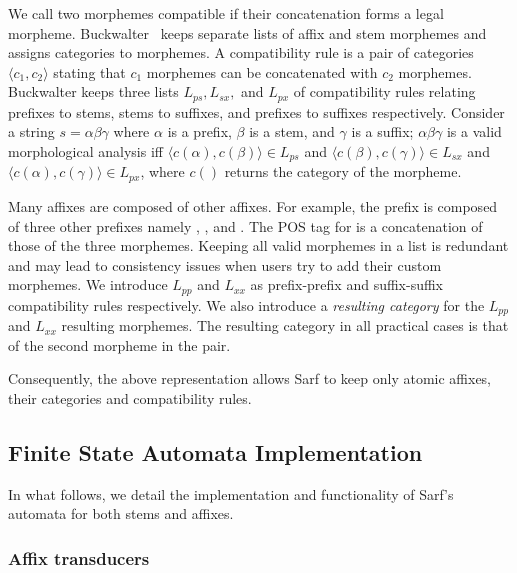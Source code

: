 \documentclass[a4,12pt]{report}
\newcommand{\noTrRL}[1]{\transfalse\RL{#1}\transtrue}
\newcommand{\noTrnoVocRL}[1]{\transfalse\novocalize\noTrRL{#1}\vocalize\transtrue}
\begin{document}
We call two morphemes compatible if their concatenation
forms a legal morpheme. 
Buckwalter~\cite{Buckwalter:02} keeps separate lists 
of affix and stem morphemes and assigns categories to
morphemes. 
A compatibility rule is a pair of categories 
$\langle c_1, c_2\rangle$  stating that $c_1$ morphemes
can be concatenated with $c_2$ morphemes.
Buckwalter keeps three lists $L_{ps}, L_{sx},$ and $L_{px}$ 
of compatibility rules relating
prefixes to stems, stems to suffixes, and prefixes to suffixes
respectively. 
Consider a string $s=\alpha\beta\gamma$ where $\alpha$ is 
a prefix, $\beta$ is a stem, and $\gamma$ is a suffix;
$\alpha\beta\gamma$ is a 
valid morphological analysis iff
$\langle c(\alpha),c(\beta)\rangle \in L_{ps}$ and
$\langle c(\beta),c(\gamma)\rangle \in L_{sx}$ and
$\langle c(\alpha),c(\gamma)\rangle \in L_{px}$, where
$c()$ returns the category of the morpheme.

Many affixes are composed of other affixes. For example,
the prefix \noTrnoVocRL{wsy} is composed of three other prefixes
namely \noTrnoVocRL{w}, \noTrnoVocRL{s}, and \noTrnoVocRL{y}.
The POS tag for \noTrnoVocRL{wsy} is a concatenation
of those of the three morphemes. 
Keeping all valid morphemes in a list
is redundant and may lead to consistency issues when
users try to add their custom morphemes.
We introduce $L_{pp}$ and
$L_{xx}$ as prefix-prefix and suffix-suffix 
compatibility rules respectively.
We also introduce a {\em resulting category}
for the $L_{pp}$ and  $L_{xx}$ resulting morphemes.
The resulting category in all practical cases
is that of the second morpheme in the pair. 

Consequently, the above representation allows Sarf to keep 
only atomic affixes, their categories and compatibility rules.

\subsection{Finite State Automata Implementation}
\label{sec:Automata}

In what follows, we detail the implementation and functionality of Sarf's
automata for both stems and affixes.

\subsubsection{Affix transducers}
\label{sec:affixFSA}
\end{document}
